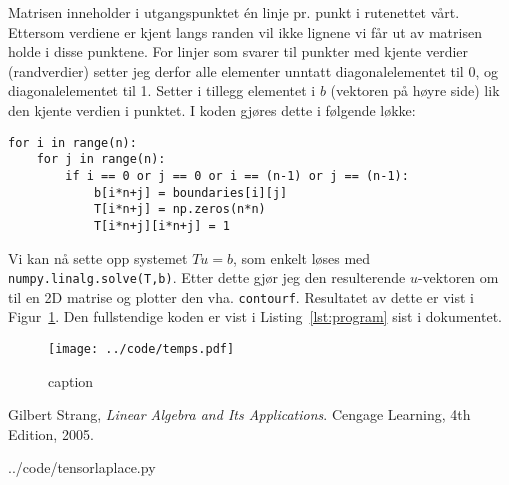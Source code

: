 Matrisen inneholder i utgangspunktet én linje pr. punkt i rutenettet vårt. Ettersom verdiene er kjent langs randen vil ikke lignene vi får ut av matrisen holde i disse punktene. For linjer som svarer til punkter med kjente verdier (randverdier) setter jeg derfor alle elementer unntatt diagonalelementet til 0, og diagonalelementet til 1. Setter i tillegg elementet i $b$ (vektoren på høyre side) lik den kjente verdien i punktet. I koden gjøres dette i følgende løkke:
\begin{lstlisting}
for i in range(n):
    for j in range(n):
        if i == 0 or j == 0 or i == (n-1) or j == (n-1):
            b[i*n+j] = boundaries[i][j]
            T[i*n+j] = np.zeros(n*n)
            T[i*n+j][i*n+j] = 1
\end{lstlisting}

Vi kan nå sette opp systemet $Tu=b$, som enkelt løses med \texttt{numpy.linalg.solve(T,b)}. Etter dette gjør jeg den resulterende $u$-vektoren om til en 2D matrise og plotter den vha. \texttt{contourf}. Resultatet av dette er vist i Figur~\ref{fig:temps}. Den fullstendige koden er vist i Listing~\ref{lst:program} sist i dokumentet.


\begin{figure}[htbp]
  \centering
  \texttt{[image: ../code/temps.pdf]}
  \caption{caption}
  \label{fig:temps}
\end{figure}


\begin{thebibliography}{1}
    Gilbert Strang,
    \emph{Linear Algebra and Its Applications}.
    Cengage Learning,
    4th Edition,
    2005.

\end{thebibliography}


\clearpage

  {../code/tensorlaplace.py}



